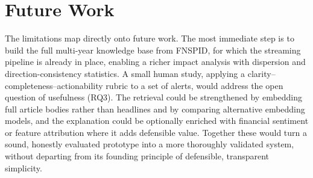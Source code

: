 \section{Future Work}
\label{sec:concl_future}

The limitations map directly onto future work. The most immediate step is to build the full
multi-year knowledge base from FNSPID, for which the streaming pipeline is already in place, enabling
a richer impact analysis with dispersion and direction-consistency statistics. A small human study,
applying a clarity--completeness--actionability rubric to a set of alerts, would address the open
question of usefulness (RQ3). The retrieval could be strengthened by embedding full article bodies
rather than headlines and by comparing alternative embedding models, and the explanation could be
optionally enriched with financial sentiment or feature attribution where it adds defensible value.
Together these would turn a sound, honestly evaluated prototype into a more thoroughly validated
system, without departing from its founding principle of defensible, transparent simplicity.
